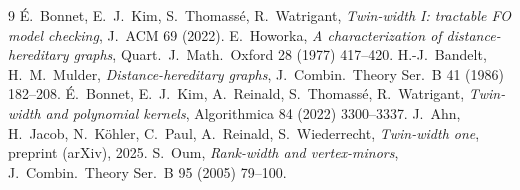 \documentclass[11pt]{article}
\theoremstyle{definition}
\theoremstyle{remark}
\begin{document}
\begin{thebibliography}{9}
 \'E.~Bonnet, E.~J.~Kim, S.~Thomass\'e, R.~Watrigant,
\emph{Twin-width I: tractable FO model checking}, J.~ACM 69 (2022).
 E.~Howorka, \emph{A characterization of distance-hereditary graphs},
Quart.\ J.\ Math.\ Oxford 28 (1977) 417--420.
 H.-J.~Bandelt, H.~M.~Mulder, \emph{Distance-hereditary graphs},
J.~Combin.\ Theory Ser.~B 41 (1986) 182--208.
 \'E.~Bonnet, E.~J.~Kim, A.~Reinald, S.~Thomass\'e, R.~Watrigant,
\emph{Twin-width and polynomial kernels}, Algorithmica 84 (2022) 3300--3337.
 J.~Ahn, H.~Jacob, N.~K\"ohler, C.~Paul, A.~Reinald,
S.~Wiederrecht, \emph{Twin-width one}, preprint (arXiv), 2025.
 S.~Oum, \emph{Rank-width and vertex-minors}, J.~Combin.\ Theory
Ser.~B 95 (2005) 79--100.
\end{thebibliography}
\end{document}
